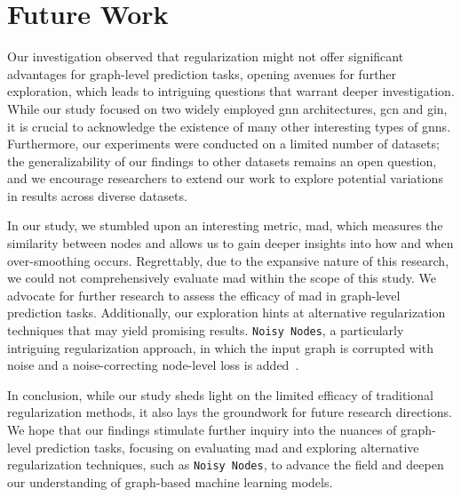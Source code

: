 \section{Future Work}
\label{sec:conclusion:future}

Our investigation observed that regularization might not offer significant advantages for graph-level prediction tasks, opening avenues for further exploration, which leads to intriguing questions that warrant deeper investigation.
While our study focused on two widely employed \ac{gnn} architectures, \ac{gcn} and \ac{gin}, it is crucial to acknowledge the existence of many other interesting types of \acp{gnn}.
Furthermore, our experiments were conducted on a limited number of datasets;
the generalizability of our findings to other datasets remains an open question, and we encourage researchers to extend our work to explore potential variations in results across diverse datasets.

In our study, we stumbled upon an interesting metric, \ac{mad}, which measures the similarity between nodes and allows us to gain deeper insights into how and when over-smoothing occurs.
Regrettably, due to the expansive nature of this research, we could not comprehensively evaluate \ac{mad} within the scope of this study.
We advocate for further research to assess the efficacy of \ac{mad} in graph-level prediction tasks.
Additionally, our exploration hints at alternative regularization techniques that may yield promising results.
\texttt{Noisy Nodes}, a particularly intriguing regularization approach, in which the input graph is corrupted with noise and a noise-correcting node-level loss is added~\cite{God22}.

In conclusion, while our study sheds light on the limited efficacy of traditional regularization methods, it also lays the groundwork for future research directions.
We hope that our findings stimulate further inquiry into the nuances of graph-level prediction tasks, focusing on evaluating \ac{mad} and exploring alternative regularization techniques, such as \texttt{Noisy Nodes}, to advance the field and deepen our understanding of graph-based machine learning models.
